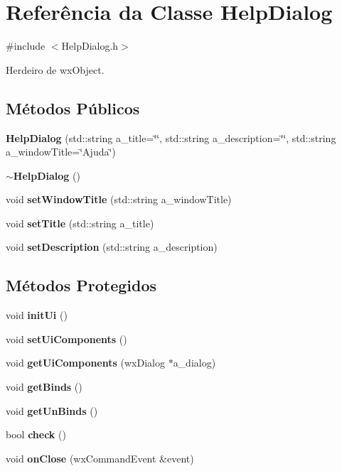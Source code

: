 \section{Referência da Classe Help\+Dialog}
\label{class_help_dialog}


{\ttfamily \#include $<$Help\+Dialog.\+h$>$}



Herdeiro de wx\+Object.

\subsection*{Métodos Públicos}
\begin{DoxyCompactItemize}
\item 
{\bf Help\+Dialog} (std\+::string a\+\_\+title=\char`\"{}\char`\"{}, std\+::string a\+\_\+description=\char`\"{}\char`\"{}, std\+::string a\+\_\+window\+Title=\char`\"{}Ajuda\char`\"{})
\item 
{\bf $\sim$\+Help\+Dialog} ()
\item 
void {\bf set\+Window\+Title} (std\+::string a\+\_\+window\+Title)
\item 
void {\bf set\+Title} (std\+::string a\+\_\+title)
\item 
void {\bf set\+Description} (std\+::string a\+\_\+description)
\end{DoxyCompactItemize}
\subsection*{Métodos Protegidos}
\begin{DoxyCompactItemize}
\item 
void {\bf init\+Ui} ()
\item 
void {\bf set\+Ui\+Components} ()
\item 
void {\bf get\+Ui\+Components} (wx\+Dialog $\ast$a\+\_\+dialog)
\item 
void {\bf get\+Binds} ()
\item 
void {\bf get\+Un\+Binds} ()
\item 
bool {\bf check} ()
\item 
void {\bf on\+Close} (wx\+Command\+Event \&event)
\end{DoxyCompactItemize}
